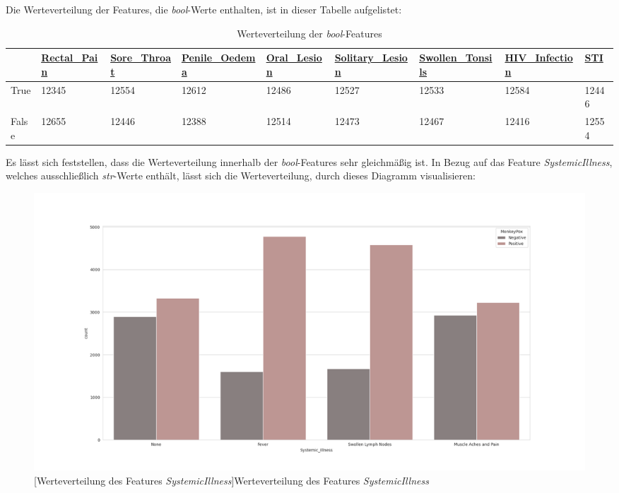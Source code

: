 \documentclass[13pt,a4paper, listof=entryprefix, bibliography=totocnumbered,toc=listofnumbered,lof=listofnumbered]{scrartcl}
\begin{document}
Die Werteverteilung der Features, die \textit{bool}-Werte enthalten, ist in dieser Tabelle aufgelistet: 
	
	\begin{singlespace}
	\begin{table}[H]
		\begin{adjustbox}{width=1\textwidth}
			\small
		\begin{tabular}{|l|l|l|l|l|l|l|l|l|}
			\hline  & \url{Rectal_Pain}&  \url{Sore_Throat}	& \url{Penile_Oedema} & \url{Oral_Lesion} & \url{Solitary_Lesion} &\url{Swollen_Tonsils} & \url{HIV_Infection} & \url{STI} \\
			\hline True & 12345 & 12554 & 12612 & 12486 & 12527 & 12533 & 12584  & 12446 \\
			\hline False & 12655 & 12446 & 12388& 12514 & 12473 & 12467 & 12416 & 12554\\
			\hline
		\end{tabular}
	\end{adjustbox}
		\caption{Werteverteilung der \textit{bool}-Features} %
		\label{tab:werteverteilung_features}
	\end{table}
\end{singlespace}
	

Es lässt sich feststellen, dass die Werteverteilung innerhalb der \textit{bool}-Features sehr gleichmäßig ist. 
In Bezug auf das Feature \textit{SystemicIllness}, welches ausschließlich \textit{str}-Werte enthält, lässt sich die 
Werteverteilung, durch dieses Diagramm visualisieren: 

	\begin{figure}[H]
		\centering
		\includegraphics[width=0.8\linewidth]{Bilder/systemic_illness_plot.png}
		[Werteverteilung des Features \textit{Systemic\textunderscore Illness}]{Werteverteilung des Features \textit{Systemic\textunderscore Illness}}
		\label{fig:systemic_illness_plot}
	\end{figure}
\end{document}
